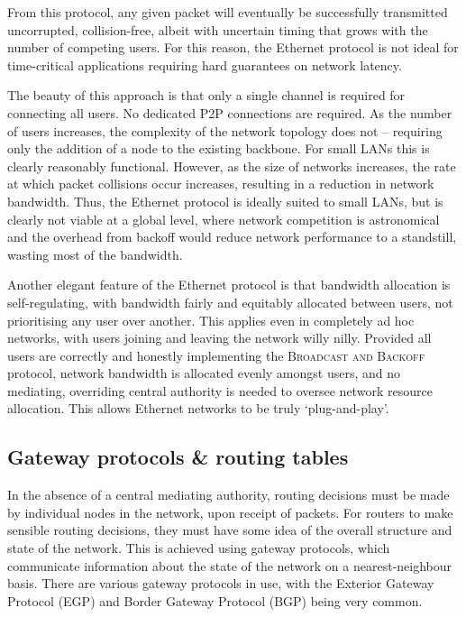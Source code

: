 \documentclass[aps,rmp,twocolumn,amsmath,amssymb,nofootinbib,superscriptaddress,longbibliography,floatfix,table-of-contents,eqsecnum]{revtex4-1}
\begin{document}
From this protocol, any given packet will eventually be successfully transmitted uncorrupted, collision-free, albeit with uncertain timing that grows with the number of competing users. For this reason, the Ethernet protocol is not ideal for time-critical applications requiring hard guarantees on network latency.

The beauty of this approach is that only a single channel is required for connecting all users. No dedicated P2P connections are required. As the number of users increases, the complexity of the network topology does not -- requiring only the addition of a node to the existing backbone. For small LANs this is clearly reasonably functional. However, as the size of networks increases, the rate at which packet collisions occur increases, resulting in a reduction in network bandwidth. Thus, the Ethernet protocol is ideally suited to small LANs, but is clearly not viable at a global level, where network competition is astronomical and the overhead from backoff would reduce network performance to a standstill, wasting most of the bandwidth.

Another elegant feature of the Ethernet protocol is that bandwidth allocation is self-regulating, with bandwidth fairly and equitably allocated between users, not prioritising any user over another. This applies even in completely ad hoc networks, with users joining and leaving the network willy nilly. Provided all users are correctly and honestly implementing the \textsc{Broadcast and Backoff} protocol, network bandwidth is allocated evenly amongst users, and no mediating, overriding central authority is needed to oversee network resource allocation. This allows Ethernet networks to be truly `plug-and-play'.

%
%

\subsection{Gateway protocols \& routing tables} \label{sec:gateway}  

In the absence of a central mediating authority, routing decisions must be made by individual nodes in the network, upon receipt of packets. For routers to make sensible routing decisions, they must have some idea of the overall structure and state of the network. This is achieved using gateway protocols, which communicate information about the state of the network on a nearest-neighbour basis. There are various gateway protocols in use, with the Exterior Gateway Protocol (EGP) and Border Gateway Protocol (BGP) being very common.
\end{document}
